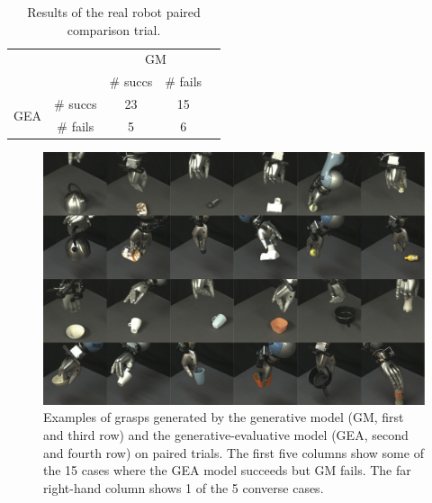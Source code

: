 \begin{table}
\begin{center}
\caption{Results of the real robot paired comparison trial.}
\label{my-label}
\begin{tabular}{|cc|c|c|l}
\cline{1-4}
                                           &         & \multicolumn{2}{c|}{GM} &  \\ \cline{3-4}
                                           &         & \# succs    & \# fails    &  \\ \cline{1-4}
\multicolumn{1}{|c|}{\multirow{2}{*}{GEA}} & \# succs & 23         & 15         &  \\
\multicolumn{1}{|c|}{}                     & \# fails & 5          & 6          &  \\ \cline{1-4}
\end{tabular}
\end{center}
\label{tab:robot-results}
\end{table}


\begin{figure}
\includegraphics[width=\textwidth]{images/successfailure}
\caption{Examples of grasps generated by the generative model (GM, first and third row) and the generative-evaluative model (GEA, second and fourth row) on paired trials. The first five columns show some of the 15 cases where the GEA model succeeds but GM fails. The far right-hand column shows 1 of the 5 converse cases. \label{fig:successfail}}
\end{figure}

%
